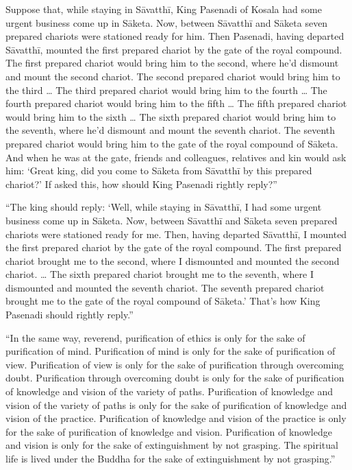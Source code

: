 \documentclass[12pt,openany]{book}%
\begin{document}
Suppose that, while staying in \textsanskrit{Sāvatthī}, King Pasenadi of Kosala had some urgent business come up in \textsanskrit{Sāketa}. Now, between \textsanskrit{Sāvatthī} and \textsanskrit{Sāketa} seven prepared chariots were stationed ready for him. Then Pasenadi, having departed \textsanskrit{Sāvatthī}, mounted the first prepared chariot by the gate of the royal compound. The first prepared chariot would bring him to the second, where he’d dismount and mount the second chariot. The second prepared chariot would bring him to the third … The third prepared chariot would bring him to the fourth … The fourth prepared chariot would bring him to the fifth … The fifth prepared chariot would bring him to the sixth … The sixth prepared chariot would bring him to the seventh, where he’d dismount and mount the seventh chariot. The seventh prepared chariot would bring him to the gate of the royal compound of \textsanskrit{Sāketa}. And when he was at the gate, friends and colleagues, relatives and kin would ask him: ‘Great king, did you come to \textsanskrit{Sāketa} from \textsanskrit{Sāvatthī} by this prepared chariot?’ If asked this, how should King Pasenadi rightly reply?” 

“The king should reply: ‘Well, while staying in \textsanskrit{Sāvatthī}, I had some urgent business come up in \textsanskrit{Sāketa}. Now, between \textsanskrit{Sāvatthī} and \textsanskrit{Sāketa} seven prepared chariots were stationed ready for me. Then, having departed \textsanskrit{Sāvatthī}, I mounted the first prepared chariot by the gate of the royal compound. The first prepared chariot brought me to the second, where I dismounted and mounted the second chariot. … The sixth prepared chariot brought me to the seventh, where I dismounted and mounted the seventh chariot. The seventh prepared chariot brought me to the gate of the royal compound of \textsanskrit{Sāketa}.’ That’s how King Pasenadi should rightly reply.” 

“In the same way, reverend, purification of ethics is only for the sake of purification of mind. Purification of mind is only for the sake of purification of view. Purification of view is only for the sake of purification through overcoming doubt. Purification through overcoming doubt is only for the sake of purification of knowledge and vision of the variety of paths. Purification of knowledge and vision of the variety of paths is only for the sake of purification of knowledge and vision of the practice. Purification of knowledge and vision of the practice is only for the sake of purification of knowledge and vision. Purification of knowledge and vision is only for the sake of extinguishment by not grasping. The spiritual life is lived under the Buddha for the sake of extinguishment by not grasping.” 
\end{document}
